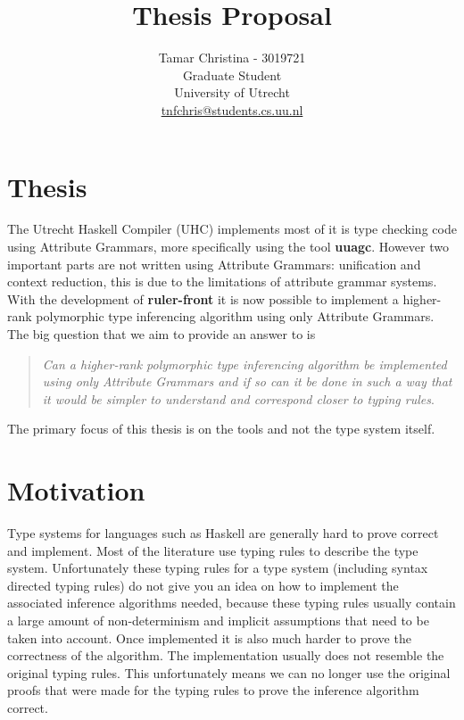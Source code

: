 \documentclass[12pt, a4paper, oneside]{article}
\begin{document}
\author{Tamar Christina - 3019721 \\Graduate Student \\University of Utrecht\\ \url{tnfchris@students.cs.uu.nl}}
\title{Thesis Proposal}
\maketitle

\section{Thesis}
The Utrecht Haskell Compiler (UHC\cite{UHC}) implements most of it is type checking code using Attribute Grammars, more specifically using the tool \textbf{uuagc}\cite{uuagc}. However two important parts are not written using Attribute Grammars: unification and context reduction, this is due to the limitations of attribute grammar systems. With the development of \textbf{ruler-front}\cite{ruler-front} it is now possible to implement a higher-rank polymorphic type inferencing algorithm using only Attribute Grammars. The big question that we aim to provide an answer to is 

\begin{quotation}
\emph{Can a higher-rank polymorphic type inferencing algorithm be implemented using only Attribute Grammars and if so can it be done in such a way that it would be simpler to understand and correspond closer to typing rules}.
\end{quotation}

The primary focus of this thesis is on the tools and not the type system itself.

\section{Motivation}
Type systems for languages such as Haskell are generally hard to prove correct and implement. Most of the literature use typing rules to describe the type system. Unfortunately these typing rules for a type system (including syntax directed typing rules) do not give you an idea on how to implement the associated inference algorithms needed, because these typing rules usually contain a large amount of non-determinism and implicit assumptions that need to be taken into account.
Once implemented it is also much harder to prove the correctness of the algorithm. The implementation usually does not resemble the original typing rules. This unfortunately means we can no longer use the original proofs that were made for the typing rules to prove the inference algorithm correct.
\end{document}
